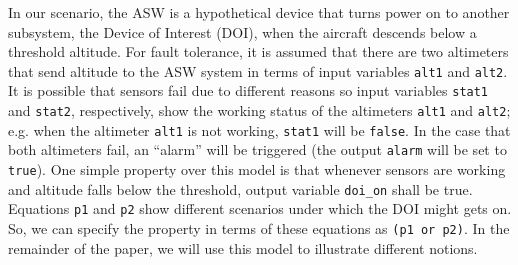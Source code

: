 In our scenario, the ASW is a hypothetical device that turns power on to another subsystem, the Device of Interest (DOI), when the aircraft descends below a threshold altitude.
For fault tolerance, it is assumed that there are two altimeters that send altitude to the ASW system in terms of input variables \texttt{alt1} and \texttt{alt2}.  
It is possible that sensors fail due to different reasons so input variables \texttt{stat1} and \texttt{stat2}, respectively, show the working status of the altimeters \texttt{alt1} and \texttt{alt2}; e.g. when the altimeter \texttt{alt1} is not working, \texttt{stat1} will be \texttt{false}. In the case that both altimeters fail, an ``alarm'' will be triggered (the output \texttt{alarm} will be set to \texttt{true}).
One simple property over this model is that whenever sensors are working and altitude falls below the threshold, output variable \texttt{doi\_on} shall be true. Equations \texttt{p1} and \texttt{p2} show different scenarios under which the DOI might gets on. So, we can specify the property in terms of these equations as \texttt{(p1 or p2)}.
In the remainder of the paper, we will use this model to illustrate different notions.
 